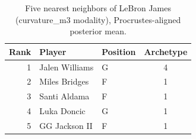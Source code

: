 \begin{table}[htbp]
  \centering\small
  \begin{tabular}{rllc}
    \toprule
    Rank & Player & Position & Archetype \\
    \midrule
    1 & Jalen Williams & G & 4 \\
    2 & Miles Bridges & F & 1 \\
    3 & Santi Aldama & F & 1 \\
    4 & Luka Doncic & G & 1 \\
    5 & GG Jackson II & F & 1 \\
    \bottomrule
  \end{tabular}
  \caption{Five nearest neighbors of LeBron James (curvature_m3 modality), Procrustes-aligned posterior mean.}
  \label{tab:LeBron_James_neighbors_curvature_m3}
\end{table}

